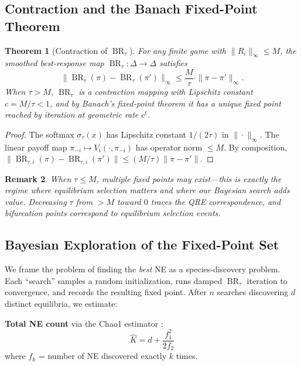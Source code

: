 \documentclass[11pt,a4paper]{article}
\newtheorem{theorem}{Theorem}[section]
\newtheorem{remark}[theorem]{Remark}
\DeclareMathOperator{\BR}{BR}
\begin{document}
\subsection{Contraction and the Banach Fixed-Point Theorem}

\begin{theorem}[Contraction of $\BR_\tau$]\label{thm:contraction}
For any finite game with $\|R_i\|_\infty \leq M$, the smoothed
best-response map $\BR_\tau : \Delta \to \Delta$ satisfies
\begin{equation}
    \|\BR_\tau(\pi) - \BR_\tau(\pi')\|_\infty
    \leq \frac{M}{\tau} \cdot \|\pi - \pi'\|_\infty.
\end{equation}
When $\tau > M$, $\BR_\tau$ is a contraction mapping with Lipschitz
constant $c = M/\tau < 1$, and by Banach's fixed-point theorem it has a
unique fixed point reached by iteration at geometric rate $c^t$.
\end{theorem}

\begin{proof}
The softmax $\sigma_\tau(x)$ has Lipschitz constant $1/(2\tau)$ in
$\|\cdot\|_\infty$. The linear payoff map
$\pi_{-i} \mapsto V_i(\cdot, \pi_{-i})$ has operator norm $\leq M$.
By composition, $\|\BR_{\tau,i}(\pi) - \BR_{\tau,i}(\pi')\| \leq (M/\tau)\|\pi - \pi'\|$.
\end{proof}

\begin{remark}
When $\tau \leq M$, multiple fixed points may exist---this is exactly
the regime where equilibrium selection matters and where our Bayesian
search adds value. Decreasing $\tau$ from $>M$ toward $0$ traces the
\emph{QRE correspondence}, and bifurcation points correspond to
equilibrium selection events.
\end{remark}

\subsection{Bayesian Exploration of the Fixed-Point Set}

We frame the problem of finding the \emph{best} NE as a species-discovery
problem. Each ``search'' samples a random initialization, runs damped
$\BR_\tau$ iteration to convergence, and records the resulting fixed point.
After $n$ searches discovering $d$ distinct equilibria, we estimate:

\textbf{Total NE count} via the Chao1 estimator \cite{chao1984}:
\begin{equation}
    \hat{K} = d + \frac{f_1^2}{2 f_2}
\end{equation}
where $f_k$ = number of NE discovered exactly $k$ times.
\end{document}
